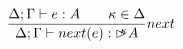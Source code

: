 \[
\frac { \Delta ;\Gamma \vdash e:A\quad \quad \kappa \in \Delta  }{ \Delta ;\Gamma \vdash next(e):{ \rhd^{\!\!\!\kappa} A } } next
\]
